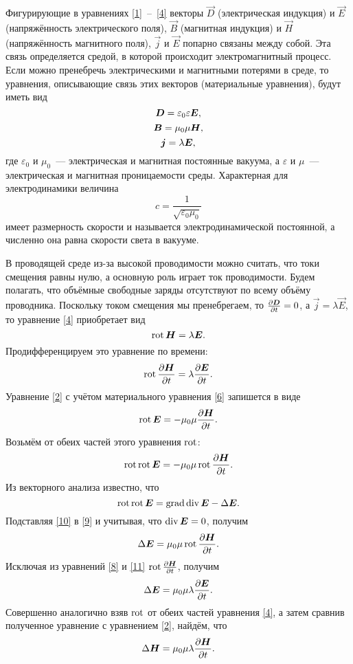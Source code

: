 Фигурирующие в уравнениях \eqref{1}~--~\eqref{4} векторы $\vec{D}$ (электрическая индукция) и $\vec{E}$ (напряжённость электрического
поля), $\vec{B}$ (магнитная индукция) и $\vec{H}$ (напряжённость магнитного поля), $\vec{j}$ и $\vec{E}$ попарно связаны между собой.
Эта связь определяется средой, в которой происходит электромагнитный процесс. Если можно пренебречь электрическими и
магнитными потерями в среде, то уравнения, описывающие связь этих векторов (материальные уравнения), будут иметь вид
\begin{equation} \eqmark{5}
\vec{D}=\varepsilon_0\varepsilon\vec{E},
\end{equation}
\begin{equation} \eqmark{6}
\vec{B}=\mu_0\mu\vec{H},
\end{equation}
\begin{equation} \eqmark{7}
\vec{j}=\lambda\vec{E},
\end{equation}
где $\varepsilon_0$ и $\mu_0$~--- электрическая и магнитная постоянные вакуума, а $\varepsilon$ и $\mu$~--- электрическая и магнитная
проницаемости среды. Характерная для электродинамики величина
\[
c=\frac{1}{\sqrt{\varepsilon_0\mu_0}}
\]
имеет размерность скорости и называется электродинамической постоянной, а численно она равна скорости света в вакууме.

В проводящей среде из-за высокой проводимости можно считать, что токи
смещения равны нулю, а основную роль играет ток проводимости. Будем полагать, что объёмные свободные заряды отсутствуют
по всему объёму проводника. Поскольку током смещения мы пренебрегаем, то $\frac{\partial {\boldsymbol{D}}}{\partial t}=0$, а $\vec{j}=\lambda\vec{E}$, то уравнение
\eqref{4} приобретает вид
\[
\mathop{\mathrm{rot}}{\boldsymbol{H}}=\lambda{\boldsymbol{E}}.
\]
Продифференцируем это уравнение по времени:
\begin{equation} \eqmark{8}
\Rot\ddt{\vec{H}}=\lambda\ddt{\vec{E}}.
\end{equation}
Уравнение \eqref{2} с учётом материального уравнения \eqref{6} запишется в виде
\[
\mathop{\mathrm{rot}}{\boldsymbol{E}}=-\mu_0\mu\frac{\partial {\boldsymbol{H}}}{\partial t}.
\]
Возьмём от обеих частей этого уравнения $\mathop{\mathrm{rot}}$:
\begin{equation} \eqmark{9}
\Rot\Rot\vec{E}=-\mu_0\mu\Rot\ddt{\vec{H}}.
\end{equation}
Из векторного анализа известно, что
\begin{equation} \eqmark{10}
\Rot\Rot\vec{E}=\Grad\Div\vec{E}-\Delta\vec{E}.
\end{equation}
Подставляя \eqref{10} в \eqref{9} и учитывая, что $\mathop{\mathrm{div}}{\boldsymbol{E}}=0$, получим
\begin{equation} \eqmark{11}
\Delta\vec{E}=\mu_0\mu\Rot\ddt{\vec{H}}.
\end{equation}
Исключая из уравнений \eqref{8} и \eqref{11} $\mathop{\mathrm{rot}}\frac{\partial {\boldsymbol{H}}}{\partial t}$, получим
\begin{equation} \eqmark{12}
\Delta\vec{E}=\mu_0\mu\lambda\ddt{\vec{E}}.
\end{equation}
Совершенно аналогично взяв $\mathop{\mathrm{rot}}$ от обеих частей уравнения \eqref{4}, а затем сравнив полученное уравнение с уравнением
\eqref{2}, найдём, что
\begin{equation} \eqmark{13}
\Delta\vec{H}=\mu_0\mu\lambda\ddt{\vec{H}}.
\end{equation}


